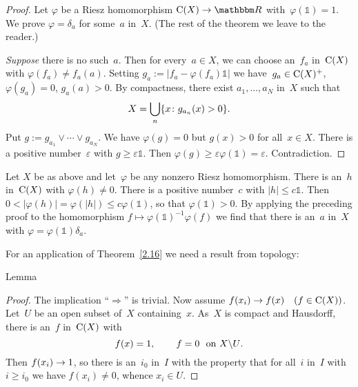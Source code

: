 \documentclass[main.tex]{subfiles}
\begin{document}
\begin{proof}
Let $\varphi$ be a Riesz homomorphism $\Cont{X}\ra \R$
with~$\varphi(\mathbb{1})=1$.
We prove $\varphi=\delta_a$ for some~$a$ in~$X$.
(The rest of the theorem 
we leave to the reader.)

\emph{Suppose} there is no such~$a$.
Then for every~$a\in X$,
we can choose an~$f_a$ in~$\mathrm{C}(X)$
with $\varphi(f_a)\neq f_a(a)$.
Setting $g_a := | f_a - \varphi(f_a) \mathbb{1}|$
we have~$g_a \in \mathrm{C}(X)^+$,
$\varphi(g_a)=0$,
$g_a(a)>0$.
By compactness,
there exist $a_1,\dotsc,a_N$ in~$X$ such that
\begin{equation*}
X = \bigcup_n \{ x\colon g_{a_n} (x) > 0 \}\text{.}
\end{equation*}
Put $g:=g_{a_1}\vee \dotsb \vee g_{a_N}$.
We have $\varphi(g) =0$ 
but $g(x)>0$ for all~$x\in X$.
There is a positive number~$\varepsilon$
with $g\geq \varepsilon \mathbb{1}$.
Then $\varphi(g)\geq \varepsilon \varphi(\mathbb{1})=\varepsilon$.
Contradiction. \xqed
\end{proof}
%
%
\begin{psec}{2.17}%
Let $X$ be as above 
and let~$\varphi$ be any nonzero Riesz homomorphism.
There is an~$h$ in~$\mathrm{C}(X)$
with $\varphi(h)\neq 0$.
There is a positive number~$c$
with $|h|\leq c\mathbb{1}$.
Then $0<|\varphi(h)|=\varphi(|h|)\leq c\varphi(\mathbb{1})$,
so that $\varphi(\mathbb{1})>0$.
By applying the preceding proof to
the homomorphism $f\mapsto \varphi(\mathbb{1})^{-1} \varphi(f)$
we find that there is an~$a$ in~$X$ 
with $\varphi = \varphi(\mathbb{1})\delta_a$.
\end{psec}
%
%
For an application of Theorem~\ref{2.16}
we need a result from topology:
\begin{psec}{2.18}{Lemma}
\end{psec}
\begin{proof}
The implication ``$\Rightarrow$'' is trivial.
Now assume $f(x_i)\rightarrow f(x)\quad (f\in \mathrm{C}(X))$.
Let~$U$ be an open subset of~$X$ containing~$x$.
As~$X$ is compact and Hausdorff,
there is an~$f$ in~$\mathrm{C}(X)$ with
\begin{equation*}
f(x)=1\text{, } 
\qquad f=0\ \text{ on }X\backslash U
\text{.}
\end{equation*}
Then $f(x_i)\rightarrow 1$, 
so there is an~$i_0$ in~$I$ with the property
that for all~$i$ in~$I$ with $i\ge i_0$
we have $f(x_i)\neq 0$, whence $x_i \in U$. \xqed
\end{proof}
\end{document}
